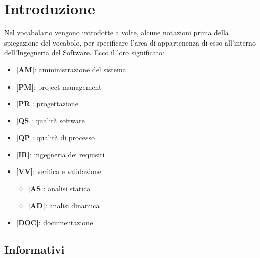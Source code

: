 %
%
%

\section{Introduzione} %
\label{sec:introduzione}
Nel vocabolario vengono introdotte a volte, alcune notazioni prima della spiegazione del vocabolo, per specificare l'area di appartenenza di esso all'interno dell'Ingegneria del Software. Ecco il loro significato:
	\begin{itemize}
		\item \textbf{[AM]}: amministrazione del sistema
		\item \textbf{[PM]}: project management
		\item \textbf{[PR]}: progettazione
		\item \textbf{[QS]}: qualità software
		\item \textbf{[QP]}: qualità di processo
		\item \textbf{[IR]}: ingegneria dei requisiti
		\item \textbf{[VV]}: verifica e validazione
			\begin{itemize}
				\item \textbf{[AS]}: analisi statica
				\item \textbf{[AD]}: analisi dinamica
			\end{itemize}
		\item \textbf{[DOC]}: documentazione
	\end{itemize}

	\subsection{Informativi} %
	\label{sub:informativi}
